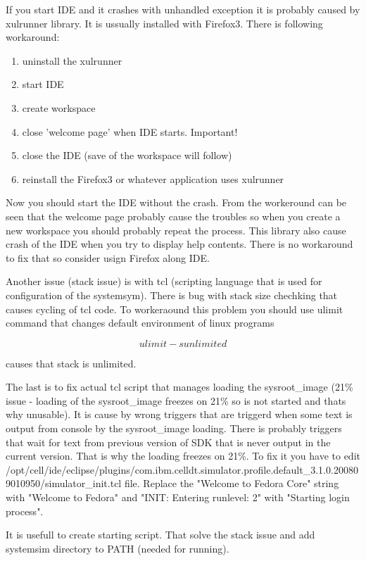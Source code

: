 \documentclass{article}
\begin{document}
If you start IDE and it crashes with unhandled exception it is probably caused by xulrunner library. It is ussually installed with Firefox3. There is following workaround:
\begin{enumerate}
\item uninstall the xulrunner
\item start IDE
\item create workspace
\item close 'welcome page' when IDE starts. Important!
\item close the IDE (save of the workspace will follow)
\item reinstall the Firefox3 or whatever application uses xulrunner
\end{enumerate}
Now you should start the IDE without the crash. From the workeround can be seen that the welcome page probably cause the troubles so when you create a new workspace you should probably repeat the process. This library also cause crash of the IDE when you try to display help contents. There is no workaround to fix that so consider usign Firefox along IDE.

Another issue (stack issue) is with tcl (scripting language that is used for configuration of the systemsym). There is bug with stack size chechking that causes cycling of tcl code. To workeraound this problem you should use ulimit command that changes default environment of linux programs

\begin{equation}
ulimit -s unlimited
\end{equation}

causes that stack is unlimited.

The last is to fix actual tcl script that manages loading the sysroot_image (21\% issue - loading of the sysroot_image freezes on 21\% so is not started and thats why unusable). It is cause by wrong triggers that are triggerd when some text is output from console by the sysroot_image loading. There is probably triggers that wait for text from previous version of SDK that is never output in the current version. That is why the loading freezes on 21\%. To fix it you have to edit /opt/cell/ide/eclipse/plugins/com.ibm.celldt.simulator.profile.default_3.1.0.200809010950/simulator_init.tcl file. Replace the "Welcome to Fedora Core" string with "Welcome to Fedora" and "INIT: Entering runlevel: 2" with "Starting login process".

It is usefull to create starting script. That solve the stack issue and add systemsim directory to PATH (needed for running).
\end{document}
